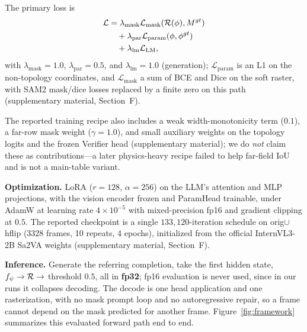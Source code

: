 The primary loss is
\begin{equation}
\begin{aligned}
\mathcal{L}
&= \lambda_{\mathrm{mask}}\mathcal{L}_{\mathrm{mask}}(\mathcal{R}(\phi), M^{gt}) \\
&\quad + \lambda_{\mathrm{par}}\mathcal{L}_{\mathrm{param}}(\phi, \phi^{gt}) \\
&\quad + \lambda_{\mathrm{lm}}\mathcal{L}_{\mathrm{LM}},
\end{aligned}
\label{eq:loss}
\end{equation}
with $\lambda_{\mathrm{mask}}{=}1.0$, $\lambda_{\mathrm{par}}{=}0.5$, and $\lambda_{\mathrm{lm}}{=}1.0$ (generation); $\mathcal{L}_{\mathrm{param}}$ is an L1 on the non-topology coordinates, and $\mathcal{L}_{\mathrm{mask}}$ a sum of BCE and Dice on the soft raster, with SAM2 mask/dice losses replaced by a finite zero on this path (supplementary material, Section~F).

The reported training recipe also includes a weak width-monotonicity term ($0.1$), a far-row mask weight ($\gamma{=}1.0$), and small auxiliary weights on the topology logits and the frozen Verifier head (supplementary material); we do \emph{not} claim these as contributions---a later physics-heavy recipe failed to help far-field IoU and is not a main-table variant.

\textbf{Optimization.} LoRA ($r{=}128$, $\alpha{=}256$) on the LLM's attention and MLP projections, with the vision encoder frozen and ParamHead trainable, under AdamW at learning rate $4{\times}10^{-5}$ with mixed-precision fp16 and gradient clipping at $0.5$.
The reported checkpoint is a single $133{,}120$-iteration schedule on orig$\cup$hflip (3328 frames, 10 repeats, 4 epochs), initialized from the official InternVL3-2B Sa2VA weights (supplementary material, Section~F).

\textbf{Inference.} Generate the referring completion, take the first \Seg{} hidden state, $f_\psi \to \mathcal{R} \to$ threshold $0.5$, all in \textbf{fp32}; fp16 evaluation is never used, since in our runs it collapses \Seg{} decoding.
The decode is one head application and one rasterization, with no mask prompt loop and no autoregressive repair, so a frame cannot depend on the mask predicted for another frame.
Figure~\ref{fig:framework} summarizes this evaluated forward path end to end.

